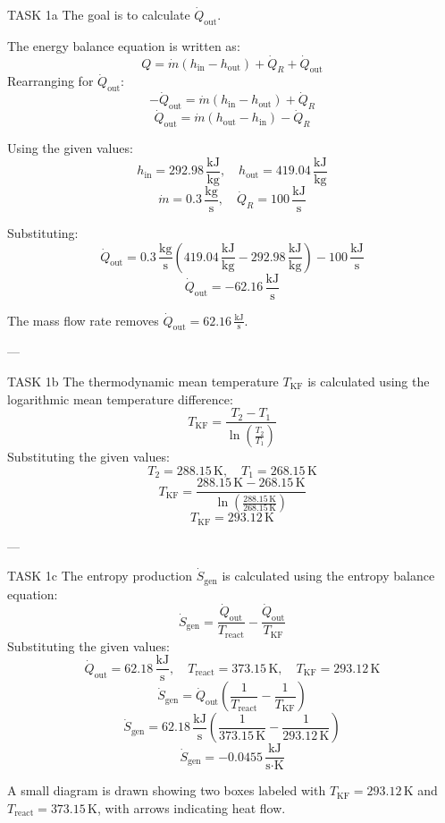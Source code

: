 TASK 1a  
The goal is to calculate \( \dot{Q}_{\text{out}} \).  

The energy balance equation is written as:  
\[
Q = \dot{m} (h_{\text{in}} - h_{\text{out}}) + \dot{Q}_R + \dot{Q}_{\text{out}}
\]  
Rearranging for \( \dot{Q}_{\text{out}} \):  
\[
-\dot{Q}_{\text{out}} = \dot{m} (h_{\text{in}} - h_{\text{out}}) + \dot{Q}_R
\]  
\[
\dot{Q}_{\text{out}} = \dot{m} (h_{\text{out}} - h_{\text{in}}) - \dot{Q}_R
\]  

Using the given values:  
\[
h_{\text{in}} = 292.98 \, \frac{\text{kJ}}{\text{kg}}, \quad h_{\text{out}} = 419.04 \, \frac{\text{kJ}}{\text{kg}}
\]  
\[
\dot{m} = 0.3 \, \frac{\text{kg}}{\text{s}}, \quad \dot{Q}_R = 100 \, \frac{\text{kJ}}{\text{s}}
\]  

Substituting:  
\[
\dot{Q}_{\text{out}} = 0.3 \, \frac{\text{kg}}{\text{s}} (419.04 \, \frac{\text{kJ}}{\text{kg}} - 292.98 \, \frac{\text{kJ}}{\text{kg}}) - 100 \, \frac{\text{kJ}}{\text{s}}
\]  
\[
\dot{Q}_{\text{out}} = -62.16 \, \frac{\text{kJ}}{\text{s}}
\]  

The mass flow rate removes \( \dot{Q}_{\text{out}} = 62.16 \, \frac{\text{kJ}}{\text{s}} \).  

---

TASK 1b  
The thermodynamic mean temperature \( T_{\text{KF}} \) is calculated using the logarithmic mean temperature difference:  
\[
T_{\text{KF}} = \frac{T_2 - T_1}{\ln \left( \frac{T_2}{T_1} \right)}
\]  
Substituting the given values:  
\[
T_2 = 288.15 \, \text{K}, \quad T_1 = 268.15 \, \text{K}
\]  
\[
T_{\text{KF}} = \frac{288.15 \, \text{K} - 268.15 \, \text{K}}{\ln \left( \frac{288.15 \, \text{K}}{268.15 \, \text{K}} \right)}
\]  
\[
T_{\text{KF}} = 293.12 \, \text{K}
\]  

---

TASK 1c  
The entropy production \( \dot{S}_{\text{gen}} \) is calculated using the entropy balance equation:  
\[
\dot{S}_{\text{gen}} = \frac{\dot{Q}_{\text{out}}}{T_{\text{react}}} - \frac{\dot{Q}_{\text{out}}}{T_{\text{KF}}}
\]  
Substituting the given values:  
\[
\dot{Q}_{\text{out}} = 62.18 \, \frac{\text{kJ}}{\text{s}}, \quad T_{\text{react}} = 373.15 \, \text{K}, \quad T_{\text{KF}} = 293.12 \, \text{K}
\]  
\[
\dot{S}_{\text{gen}} = \dot{Q}_{\text{out}} \left( \frac{1}{T_{\text{react}}} - \frac{1}{T_{\text{KF}}} \right)
\]  
\[
\dot{S}_{\text{gen}} = 62.18 \, \frac{\text{kJ}}{\text{s}} \left( \frac{1}{373.15 \, \text{K}} - \frac{1}{293.12 \, \text{K}} \right)
\]  
\[
\dot{S}_{\text{gen}} = -0.0455 \, \frac{\text{kJ}}{\text{s·K}}
\]  

A small diagram is drawn showing two boxes labeled with \( T_{\text{KF}} = 293.12 \, \text{K} \) and \( T_{\text{react}} = 373.15 \, \text{K} \), with arrows indicating heat flow.